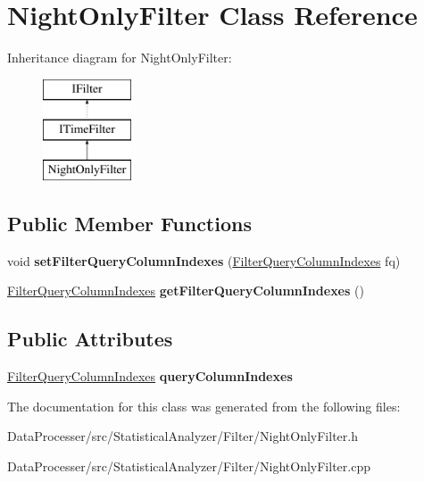 \hypertarget{classNightOnlyFilter}{}\section{Night\+Only\+Filter Class Reference}
\label{classNightOnlyFilter}
Inheritance diagram for Night\+Only\+Filter\+:\begin{figure}[H]
\begin{center}
\leavevmode
\includegraphics[height=3.000000cm]{classNightOnlyFilter}
\end{center}
\end{figure}
\subsection*{Public Member Functions}
\begin{DoxyCompactItemize}
\item 
\mbox{\label{classNightOnlyFilter_a10071792de61a025fb3416b2e3a0da9d}} 
void {\bfseries set\+Filter\+Query\+Column\+Indexes} (\hyperlink{structFilterQueryColumnIndexes}{Filter\+Query\+Column\+Indexes} fq)
\item 
\mbox{\label{classNightOnlyFilter_a8efc92bd9d61b15700141db8d8687f53}} 
\hyperlink{structFilterQueryColumnIndexes}{Filter\+Query\+Column\+Indexes} {\bfseries get\+Filter\+Query\+Column\+Indexes} ()
\end{DoxyCompactItemize}
\subsection*{Public Attributes}
\begin{DoxyCompactItemize}
\item 
\mbox{\label{classNightOnlyFilter_a5411878df9e064072f750b7cf26286ae}} 
\hyperlink{structFilterQueryColumnIndexes}{Filter\+Query\+Column\+Indexes} {\bfseries query\+Column\+Indexes}
\end{DoxyCompactItemize}


The documentation for this class was generated from the following files\+:\begin{DoxyCompactItemize}
\item 
Data\+Processer/src/\+Statistical\+Analyzer/\+Filter/Night\+Only\+Filter.\+h\item 
Data\+Processer/src/\+Statistical\+Analyzer/\+Filter/Night\+Only\+Filter.\+cpp\end{DoxyCompactItemize}
